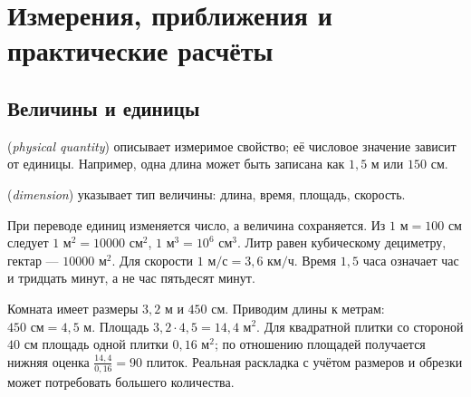 \chapter{Измерения, приближения и практические расчёты}\label{chap:exam-measurements}
\section{Величины и единицы}
\begin{definition} (\emph{physical quantity}) описывает измеримое свойство; её числовое значение зависит от единицы. Например, одна длина может быть записана как \(1{,}5\) м или \(150\) см. \par{} (\emph{dimension}) указывает тип величины: длина, время, площадь, скорость.\end{definition}
При переводе единиц изменяется число, а величина сохраняется. Из \(1\text{ м}=100\text{ см}\) следует \(1\text{ м}^2=10000\text{ см}^2\), \(1\text{ м}^3=10^6\text{ см}^3\). Литр равен кубическому дециметру, гектар --- \(10000\text{ м}^2\). Для скорости \(1\text{ м/с}=3{,}6\text{ км/ч}\). Время \(1{,}5\) часа означает час и тридцать минут, а не час пятьдесят минут.
\begin{example}Комната имеет размеры \(3{,}2\) м и \(450\) см. Приводим длины к метрам: \(450\text{ см}=4{,}5\text{ м}\). Площадь \(3{,}2\cdot4{,}5=14{,}4\text{ м}^2\). Для квадратной плитки со стороной \(40\) см площадь одной плитки \(0{,}16\text{ м}^2\); по отношению площадей получается нижняя оценка \(\frac{14{,}4}{0{,}16}=90\) плиток. Реальная раскладка с учётом размеров и обрезки может потребовать большего количества.\end{example}
